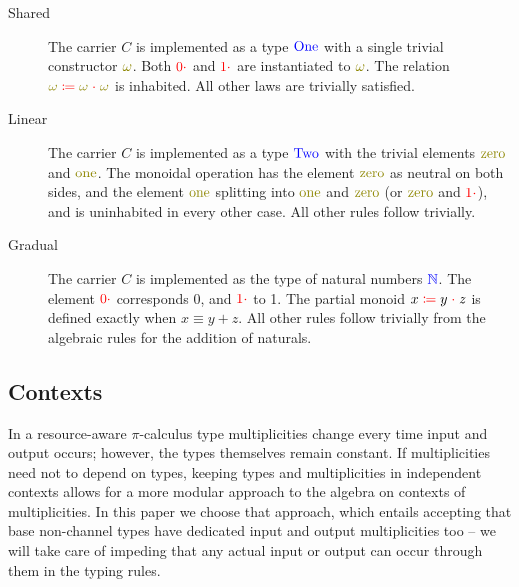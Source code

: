 \documentclass[a4paper,UKenglish,cleveref, autoref, thm-restate,authorcolumns]{lipics-v2019}
\theoremstyle{definition}
\newcommand{\picalc}{$\pi$-calculus}
\newcommand{\type}[1]{\textcolor{blue}{\operatorname{#1}}}
\newcommand{\constr}[1]{\textcolor{olive}{\operatorname{#1}}}
\newcommand{\field}[1]{\textcolor{red}{\operatorname{#1}}}
\newcommand{\op}[3]{#1 \; \field{\coloneqq} \; #2 \; \field{\cdot} \; #3}
\newcommand{\zero}{\field{0\cdot}}
\newcommand{\one}{\field{1\cdot}}
\newcommand{\N}{\type{\mathbb{N}}}
\begin{document}
\begin{description}

\item [Shared]

The carrier $C$ is implemented as a type $\type{One}$ with a single trivial constructor $\constr{\omega}$.
Both $\zero$ and $\one$ are instantiated to $\constr{\omega}$.
The relation $\op{\constr{\omega}}{\constr{\omega}}{\constr{\omega}}$ is inhabited.
All other laws are trivially satisfied.

\item [Linear]

The carrier $C$ is implemented as a type $\type{Two}$ with the trivial elements $\constr{zero}$ and $\constr{one}$.
The monoidal operation has the element $\constr{zero}$ as neutral on both sides, and the element $\constr{one}$ splitting into $\constr{one}$ and $\constr{zero}$ (or $\constr{zero}$ and $\constr{\one}$), and is uninhabited in every other case.
All other rules follow trivially.

\item [Gradual]

The carrier $C$ is implemented as the type of natural numbers $\N$.
The element $\zero$ corresponds 0, and $\one$ to 1.
The partial monoid $\op{x}{y}{z}$ is defined exactly when $x \equiv y + z$.
All other rules follow trivially from the algebraic rules for the addition of naturals.
\end{description}

\subsection{Contexts}
\label{contexts}

In a resource-aware \picalc{} type multiplicities change every time input and output occurs; however, the types themselves remain constant.
If multiplicities need not to depend on types, keeping types and multiplicities in independent contexts allows for a more modular approach to the algebra on contexts of multiplicities.
In this paper we choose that approach, which entails accepting that base non-channel types have dedicated input and output multiplicities too -- we will take care of impeding that any actual input or output can occur through them in the typing rules.
\end{document}
